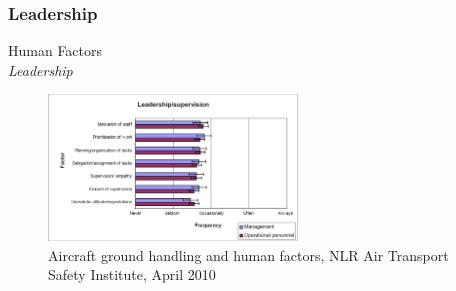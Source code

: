 \subsubsection{Leadership}
\begin{frame}{Human Factors\\\small\textit{Leadership}}{}
	\begin{figure}[H]
	\centering
	\includegraphics[width=250px]{Grafik/Leadership}
	\caption{\footnotesize Aircraft ground handling and human factors, NLR Air Transport Safety Institute, April 2010}
\end{figure}
\end{frame}